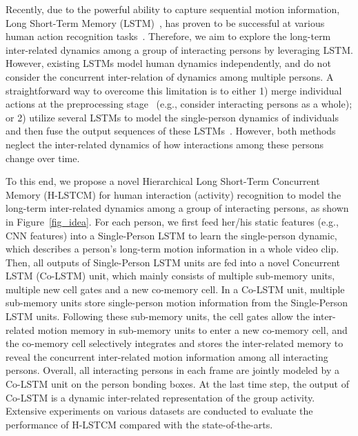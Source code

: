 \documentclass[9pt,journal,letterpaper,twocolumn]{IEEEtran}
\begin{document}
Recently, due to the powerful ability to capture sequential motion information, Long Short-Term Memory (LSTM)~\cite{hochreiter1997long}, has proven to be successful at various human action recognition tasks~\cite{donahue2015long,du2015hierarchical,veeriah2015differential,liu2016spatio,ibrahim2015hierarchical}. Therefore, we aim to explore the long-term inter-related dynamics among a group of interacting persons by leveraging LSTM. However, existing LSTMs model human  dynamics independently, and do not consider the concurrent inter-relation of dynamics among multiple persons. A straightforward way to overcome this limitation is to either 1) merge individual actions at the preprocessing stage~\cite{ke2016spatial} (e.g., consider interacting persons as a whole); or 2) utilize several LSTMs to model the single-person dynamics of individuals and then fuse the output sequences of these LSTMs~\cite{ibrahim2015hierarchical}. However, both methods neglect the inter-related dynamics of how interactions among these persons change over time. 
	
	
	
	
	To this end, we propose a novel Hierarchical Long Short-Term Concurrent Memory (H-LSTCM) for human interaction (activity) recognition to model the long-term inter-related dynamics among a group of interacting persons, as shown in Figure~\ref{fig_idea}. For each person, we first feed her/his static features (e.g., CNN features) into a Single-Person LSTM to learn the single-person dynamic, which describes a person's long-term motion information in a whole video clip. Then, all outputs of Single-Person LSTM units are fed into a novel Concurrent LSTM (Co-LSTM) unit, which mainly consists of multiple sub-memory units, multiple new cell gates and a new co-memory cell. In a Co-LSTM unit, multiple sub-memory units store single-person motion information from the Single-Person LSTM units. Following these sub-memory units, the cell gates allow the inter-related motion memory in sub-memory units to enter a new co-memory cell, and the co-memory cell selectively integrates and stores the inter-related memory to reveal the concurrent inter-related motion information among all interacting persons. Overall, all interacting persons in each frame are jointly modeled by a Co-LSTM unit on the person bonding boxes. At the last time step, the output of Co-LSTM is a dynamic inter-related representation of the group activity. 
	Extensive experiments on various datasets are conducted to evaluate the performance of H-LSTCM compared with the state-of-the-arts.
\end{document}
